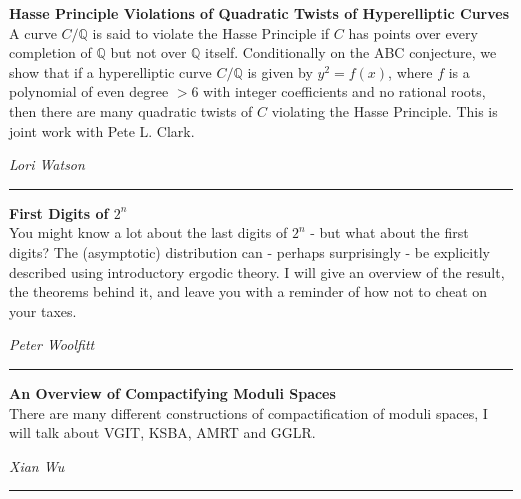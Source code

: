 \documentclass[oneside]{amsart}
\begin{document}
\filbreak
\hspace{-20pt}\textbf{ \textbf{ Hasse Principle Violations of Quadratic Twists of Hyperelliptic Curves } } \vspace{0.5em}\\
A curve $C/\mathbb{Q}$ is said to violate the Hasse Principle if $C$ has points over every completion of  $\mathbb{Q}$ but not over $\mathbb{Q}$  itself. Conditionally on the ABC conjecture, we show that if a hyperelliptic curve $C/\mathbb{Q}$ is given by $y^2 = f(x)$, where $f$ is a polynomial of even degree $> 6$ with integer coefficients and no rational roots, then there are many quadratic twists of $C$ violating the Hasse Principle. This is joint work with Pete L. Clark. \vspace{-1em}\\
\begin{flushright} \textit{ Lori Watson } \vspace{0.5em} \end{flushright}
\rule{\textwidth}{0.4pt}
\vspace{0.5em}

\filbreak
\hspace{-20pt}\textbf{ \textbf{ First Digits of $2^n$ } } \vspace{0.5em}\\
You might know a lot about the last digits of $2^n$ - but what about the first digits? The (asymptotic) distribution can - perhaps surprisingly - be explicitly described using introductory ergodic theory. I will give an overview of the result, the theorems behind it, and leave you with a reminder of how not to cheat on your taxes. \vspace{-1em}\\
\begin{flushright} \textit{ Peter Woolfitt } \vspace{0.5em} \end{flushright}
\rule{\textwidth}{0.4pt}
\vspace{0.5em}

\filbreak
\hspace{-20pt}\textbf{ \textbf{ An Overview of Compactifying Moduli Spaces } } \vspace{0.5em}\\
There are many different constructions of compactification of moduli spaces, I will talk about VGIT, KSBA, AMRT and GGLR. \vspace{-1em}\\
\begin{flushright} \textit{ Xian Wu } \vspace{0.5em} \end{flushright}
\rule{\textwidth}{0.4pt}
\vspace{0.5em}
\end{document}

